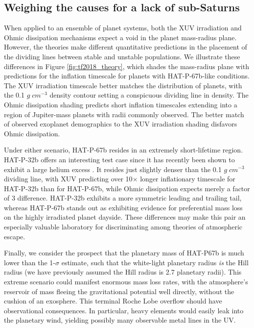 \documentclass[twocolumn]{aastex631}
\begin{document}
\subsection{Weighing the causes for a lack of sub-Saturns}

When applied to an ensemble of planet systems, both the XUV irradiation and Ohmic dissipation mechanisms expect a void in the planet mass-radius plane. However, the theories make different quantitative predictions in the placement of the dividing lines between stable and unstable populations.  We illustrate these differences in Figure \ref{fig:tf2018_theory}, which shades the mass-radius plane with predictions for the inflation timescale for planets with HAT-P-67b-like conditions.  The XUV irradiation timescale better matches the distribution of planets, with the 0.1 $g\;cm^{-3}$ density contour setting a conspicuous dividing line in density.  The Ohmic dissipation shading predicts short inflation timescales extending into a region of Jupiter-mass planets with radii commonly observed.  The better match of observed exoplanet demographics to the XUV irradiation shading disfavors Ohmic dissipation.   

Under either scenario, HAT-P-67b resides in an extremely short-lifetime region.  HAT-P-32b offers an interesting test case since it has recently been shown to exhibit a large helium excess .  It resides just slightly denser than the 0.1 $g\;cm^{-3}$ dividing line, with XUV predicting over 10$\times$ longer inflationary timescale for HAT-P-32b than for HAT-P-67b, while Ohmic dissipation expects merely a factor of 3 difference.  HAT-P-32b exhibits a more symmetric leading and trailing tail, whereas HAT-P-67b stands out as exhibiting evidence for preferential mass loss on the highly irradiated planet dayside.  These differences may make this pair an especially valuable laboratory for discriminating among theories of atmospheric escape.

Finally, we consider the prospect that the planetary mass of HAT-P67b is much lower than the 1-$\sigma$ estimate, such that the white-light planetary radius \emph{is} the Hill radius (we have previously assumed the Hill radius is 2.7 planetary radii).  This extreme scenario could manifest enormous mass loss rates, with the atmosphere's reservoir of mass fleeing the gravitational potential well directly, without the cushion of an exosphere.  This terminal Roche Lobe overflow should have observational consequences.  In particular, heavy elements would easily leak into the planetary wind, yielding possibly many observable metal lines in the UV.
\end{document}
